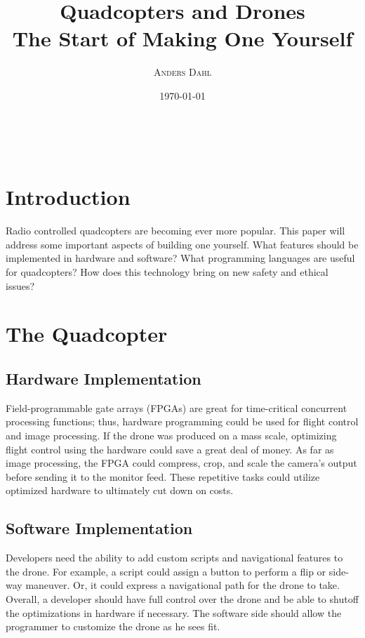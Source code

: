 \documentclass[a4paper, 11pt]{article} %
\title{\textbf{Quadcopters and Drones}\\ %
The Start of Making One Yourself} %
\author{\textsc{Anders Dahl}} %
\date{\today} %
\makeatletter
\renewcommand{\maketitle}{ %
\begin{flushright} %
{\LARGE\@title} %

\vspace{50pt} %

{\large\@author} %
\\\@date %

\vspace{40pt} %
\end{flushright}
}
\makeatother
\begin{document}
\maketitle %

\vspace{30pt} %


\section*{Introduction}

Radio controlled quadcopters are becoming ever more popular. This paper will address some important aspects of building one yourself. What features should be implemented in hardware and software? What programming languages are useful for quadcopters? How does this technology bring on new safety and ethical issues?


\section*{The Quadcopter}

\subsection{Hardware Implementation}

Field-programmable gate arrays (FPGAs) are great for time-critical concurrent processing functions; thus, hardware programming could be used for flight control and image processing. If the drone was produced on a mass scale, optimizing flight control using the hardware could save a great deal of money. As far as image processing, the FPGA could compress, crop, and scale the camera's output before sending it to the monitor feed. These repetitive tasks could utilize optimized hardware to ultimately cut down on costs.

\subsection{Software Implementation}

Developers need the ability to add custom scripts and navigational features to the drone. For example, a script could assign a button to perform a flip or side-way maneuver. Or, it could express a navigational path for the drone to take. Overall, a developer should have full control over the drone and be able to shutoff the optimizations in hardware if necessary. The software side should allow the programmer to customize the drone as he sees fit. \cite{DIY} 
\end{document}
